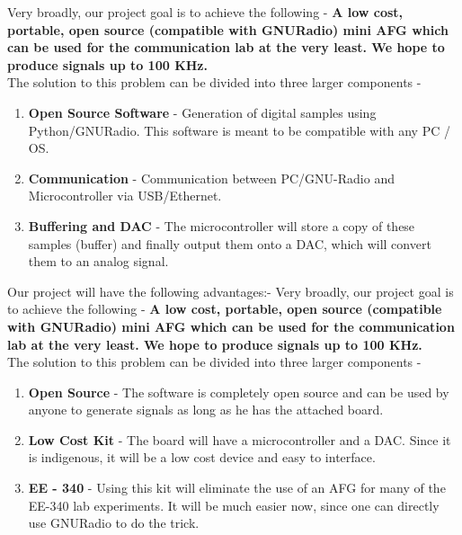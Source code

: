 \documentclass{article}
\begin{document}
Very broadly, our project goal is to achieve the following - \textbf{A low cost, portable, open source (compatible with GNURadio) mini AFG which can be used for the communication lab at the very least. We hope to produce signals up to 100 KHz.}
\\The solution to this problem can be divided into three larger components -
\begin{enumerate}
\item \textbf{Open Source Software} - Generation of digital samples using Python/GNURadio. This software is meant to be compatible with any PC / OS.
\item \textbf{Communication} - Communication between PC/GNU-Radio and Microcontroller via USB/Ethernet.
\item \textbf{Buffering and DAC} - The microcontroller will store a copy of these samples (buffer) and finally output them onto a DAC, which will convert them to an analog signal.
\end{enumerate}
Our project will have the following advantages:-
Very broadly, our project goal is to achieve the following - \textbf{A low cost, portable, open source (compatible with GNURadio) mini AFG which can be used for the communication lab at the very least. We hope to produce signals up to 100 KHz.}
\\The solution to this problem can be divided into three larger components -
\begin{enumerate}
\item \textbf{Open Source} - The software is completely open source and can be used by anyone to generate signals as long as he has the attached board.
\item \textbf{Low Cost Kit} - The board will have a microcontroller and a DAC. Since it is indigenous, it will be a low cost device and easy to interface.
\item \textbf{EE - 340} - Using this kit will eliminate the use of an AFG for many of the EE-340 lab experiments. It will be much easier now, since one can directly use GNURadio to do the trick.
\end{enumerate}
\end{document}
